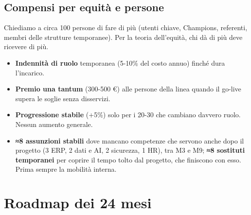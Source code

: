 \documentclass[11pt,a4paper]{article}
\begin{document}
\subsection{Compensi per equità e persone}\label{sec:13.6}
Chiediamo a circa 100 persone di fare di più (utenti chiave, Champions, referenti, membri delle strutture temporanee). Per la teoria dell'equità, chi dà di più deve ricevere di più.
\begin{itemize}
\item \textbf{Indennità di ruolo} temporanea (5-10\% del costo annuo) finché dura l'incarico.
\item \textbf{Premio una tantum} (300-500 €) alle persone della linea quando il go-live supera le soglie senza disservizi.
\item \textbf{Progressione stabile} (+5\%) solo per i 20-30 che cambiano davvero ruolo. Nessun aumento generale.
\item \textbf{≈8 assunzioni stabili} dove mancano competenze che servono anche dopo il progetto (3 ERP, 2 dati e AI, 2 sicurezza, 1 HR), tra M3 e M9; \textbf{≈8 sostituti temporanei} per coprire il tempo tolto dal progetto, che finiscono con esso. Prima sempre la mobilità interna.
\end{itemize}

\section{Roadmap dei 24 mesi}\label{sec:14}
\end{document}
